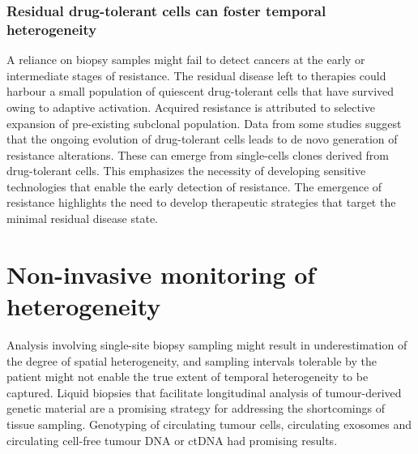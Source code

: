 		\subsubsection{Residual drug-tolerant cells can foster temporal heterogeneity}
		A reliance on biopsy samples might fail to detect cancers at the early or intermediate stages of resistance.
		The residual disease left to therapies could harbour a small population of quiescent drug-tolerant cells that have survived owing to adaptive activation.
		Acquired resistance is attributed to selective expansion of pre-existing subclonal population.
		Data from some studies suggest that the ongoing evolution of drug-tolerant cells leads to de novo generation of resistance alterations.
		These can emerge from single-cells clones derived from drug-tolerant cells.
		This emphasizes the necessity of developing sensitive technologies that enable the early detection of resistance.
		The emergence of resistance highlights the need to develop therapeutic strategies that target the minimal residual disease state.

\section{Non-invasive monitoring of heterogeneity}
Analysis involving single-site biopsy sampling might result in underestimation of the degree of spatial heterogeneity, and sampling intervals tolerable by the patient might not enable the true extent of temporal heterogeneity to be captured.
Liquid biopsies that facilitate longitudinal analysis of tumour-derived genetic material are a promising strategy for addressing the shortcomings of tissue sampling.
Genotyping of circulating tumour cells, circulating exosomes and circulating cell-free tumour DNA or ctDNA had promising results.

